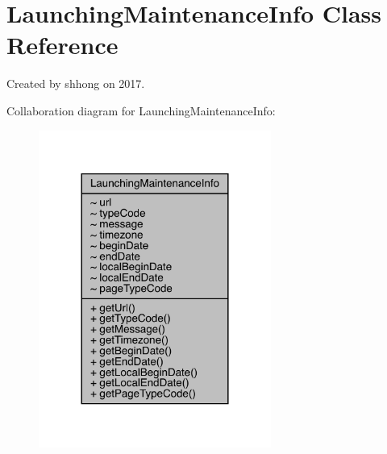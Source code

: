 \hypertarget{classcom_1_1toast_1_1android_1_1gamebase_1_1launching_1_1data_1_1_launching_maintenance_info}{}\section{Launching\+Maintenance\+Info Class Reference}
\label{classcom_1_1toast_1_1android_1_1gamebase_1_1launching_1_1data_1_1_launching_maintenance_info}


Created by shhong on 2017.  




Collaboration diagram for Launching\+Maintenance\+Info\+:
\nopagebreak
\begin{figure}[H]
\begin{center}
\leavevmode
\includegraphics[width=216pt]{classcom_1_1toast_1_1android_1_1gamebase_1_1launching_1_1data_1_1_launching_maintenance_info__coll__graph}
\end{center}
\end{figure}
